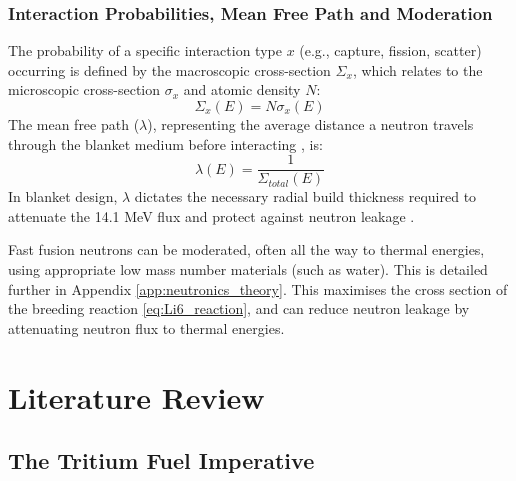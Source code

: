 \documentclass[12pt]{article}
\begin{document}
\subsubsection{Interaction Probabilities, Mean Free Path and Moderation}
\label{sec:meanfreepath_theory}
The probability of a specific interaction type $x$ (e.g., capture, fission, scatter) occurring is
defined by the macroscopic cross-section $\Sigma_x$, which relates to the microscopic cross-section
$\sigma_x$ and atomic density $N$:
\begin{equation}
    \Sigma_x(E) = N \sigma_x(E)
    \label{eq:macroscopic_cross_section}
\end{equation}
The mean free path ($\lambda$), representing the average distance a neutron travels through the
blanket medium before interacting \cite{nuclearphysics}, is:
\begin{equation}
    \lambda(E) = \frac{1}{\Sigma_{total}(E)}
    \label{eq:mean_free_path}
\end{equation}
In blanket design, $\lambda$ dictates the necessary radial build thickness required to attenuate the
14.1 MeV flux and protect against neutron leakage \cite{tas_liquid_1988}.

Fast fusion neutrons can be moderated, often all the way to thermal energies, using appropriate low
mass number materials (such as water). This is detailed further in Appendix
\ref{app:neutronics_theory}. This maximises the cross section of the breeding reaction
\ref{eq:Li6_reaction}, and can reduce neutron leakage by attenuating neutron flux to thermal
energies.



\section{Literature Review}
\label{sec:lit_review}

\subsection{The Tritium Fuel Imperative}
\label{sec:tritium_literature}
\end{document}
